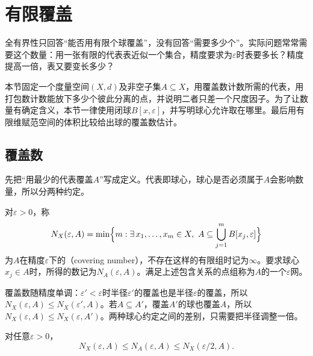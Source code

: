 \section{有限覆盖}
\label{sec:metric-finite-covers}

全有界性只回答“能否用有限个球覆盖”，没有回答“需要多少个”。实际问题常常需要这个数量：用一张有限的代表表近似一个集合，精度要求为$\varepsilon$时表要多长？精度提高一倍，表又要变长多少？

本节固定一个度量空间$(X,d)$及非空子集$A\subseteq X$，用覆盖数计数所需的代表，用打包数计数能放下多少个彼此分离的点，并说明二者只差一个尺度因子。为了让数量有确定含义，本节一律使用闭球$B[x,\varepsilon]$，并写明球心允许取在哪里。最后用有限维赋范空间的体积比较给出球的覆盖数估计。

\subsection{覆盖数}
\label{sec:metric-covering-number}

先把“用最少的代表覆盖$A$”写成定义。代表即球心，球心是否必须属于$A$会影响数量，所以分两种约定。

\begin{definition}[覆盖数]
\label{def:metric-covering-number}
对$\varepsilon>0$，称
\begin{equation}
N_X(\varepsilon,A)=\min\Bigl\{m:\exists\,x_1,\ldots,x_m\in X,\ A\subseteq\bigcup_{j=1}^mB[x_j,\varepsilon]\Bigr\}
\label{eq:metric-covering-number}
\end{equation}
为$A$在精度$\varepsilon$下的（covering number），不存在这样的有限组时记为$\infty$。要求球心$x_j\in A$时，所得的数记为$N_A(\varepsilon,A)$。满足上述包含关系的点组称为$A$的一个$\varepsilon$网。
\end{definition}

覆盖数随精度单调：$\varepsilon'<\varepsilon$时半径$\varepsilon'$的覆盖也是半径$\varepsilon$的覆盖，所以$N_X(\varepsilon,A)\leq N_X(\varepsilon',A)$。若$A\subseteq A'$，覆盖$A'$的球也覆盖$A$，所以$N_X(\varepsilon,A)\leq N_X(\varepsilon,A')$。两种球心约定之间的差别，只需要把半径调整一倍。

\begin{theorem}[球心范围与覆盖数]
\label{thm:metric-covering-centers}
对任意$\varepsilon>0$，
\begin{equation}
N_X(\varepsilon,A)\leq N_A(\varepsilon,A)\leq N_X(\varepsilon/2,A).
\label{eq:metric-covering-centers}
\end{equation}
\end{theorem}

